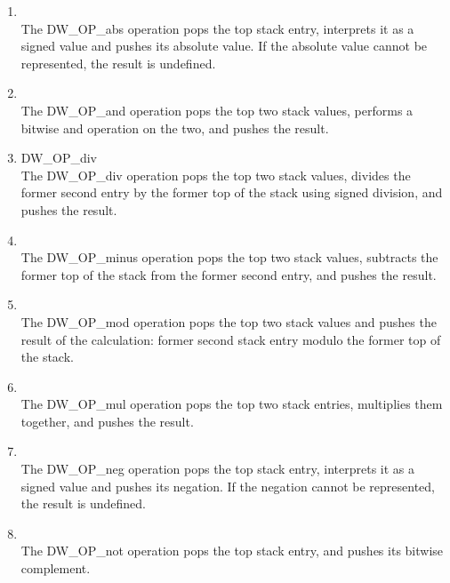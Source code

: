 \begin{enumerate}[1]
\item {}  \\
The DW\-\_OP\-\_abs operation pops the top stack entry, interprets
it as a signed value and pushes its absolute value. If the
absolute value cannot be represented, the result is undefined.

\item {} \\
The DW\-\_OP\-\_and operation pops the top two stack values, performs
a bitwise and operation on the two, and pushes the result.

\item \label{chap:DWOPdiv}{DW\-\_OP\-\_div} \\
The DW\-\_OP\-\_div operation pops the top two stack values, divides the former second entry by
the former top of the stack using signed division, and pushes the result.

\item {} \\
The DW\-\_OP\-\_minus operation pops the top two stack values, subtracts the former top of the
stack from the former second entry, and pushes the result.

\item {}\\
The DW\-\_OP\-\_mod operation pops the top two stack values and pushes the result of the
calculation: former second stack entry modulo the former top of the stack.

\item {} \\
The DW\-\_OP\-\_mul operation pops the top two stack entries, multiplies them together, and
pushes the result.

\item  {} \\
The DW\-\_OP\-\_neg operation pops the top stack entry, interprets
it as a signed value and pushes its negation. If the negation
cannot be represented, the result is undefined.

\item  {} \\
The DW\-\_OP\-\_not operation pops the top stack entry, and pushes
its bitwise complement.


\end{enumerate}
